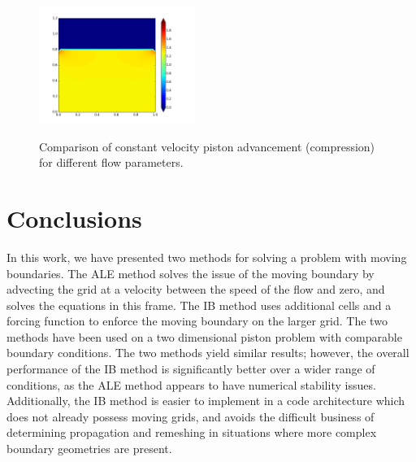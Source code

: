 \documentclass{article}
\begin{document}
\begin{figure}
{\includegraphics[width=2in]{contour-P12-IBcon.png} \hspace{260pt}
}
\vspace{-8pt}
\caption{\label{fig:parameters} Comparison of constant velocity piston advancement (compression) for different flow parameters.} 
\end{figure}
%



\section{Conclusions}

In this work, we have presented two methods for solving a problem with moving boundaries.  The ALE method solves the issue of the moving boundary by advecting the grid at a velocity between the speed of the flow and zero, and solves the equations in this frame.  The IB method uses additional cells and a forcing function to enforce the moving boundary on the larger grid.  The two methods have been used on a two dimensional piston problem with comparable boundary conditions.  The two methods yield similar results; however, the overall performance of the IB method is significantly better over a wider range of conditions, as the ALE method appears to have numerical stability issues.  Additionally, the IB method is easier to implement in a code architecture which does not already possess moving grids, and avoids the difficult business of determining propagation and remeshing in situations where more complex boundary geometries are present.
\end{document}
